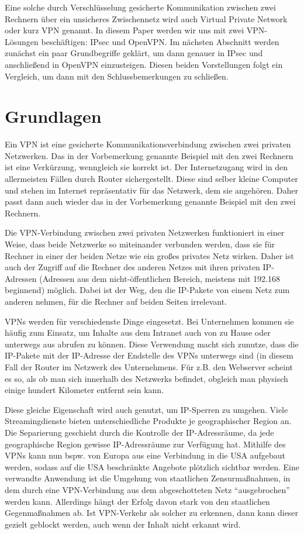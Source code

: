 \documentclass[12pt]{scrartcl}
\begin{document}
Eine solche durch Verschlüsselung gesicherte Kommunikation zwischen zwei Rechnern über ein unsicheres Zwischennetz wird auch Virtual Private Network oder kurz VPN genannt. In diesem Paper werden wir uns mit zwei VPN-Lösungen beschäftigen: IPsec und OpenVPN. Im nächsten Abschnitt werden zunächst ein paar Grundbegriffe geklärt, um dann genauer in IPsec und anschließend in OpenVPN einzusteigen. Diesen beiden Vorstellungen folgt ein Vergleich, um dann mit den Schlussbemerkungen zu schließen.

\section{Grundlagen}
Ein VPN ist eine gesicherte Kommunikationsverbindung zwischen zwei privaten Netzwerken. Das in der Vorbemerkung genannte Beispiel mit den zwei Rechnern ist eine Verkürzung, wenngleich sie korrekt ist. Der Internetzugang wird in den allermeisten Fällen durch Router sichergestellt. Diese sind selber kleine Computer und stehen im Internet repräsentativ für das Netzwerk, dem sie angehören. Daher passt dann auch wieder das in der Vorbemerkung genannte Beispiel mit den zwei Rechnern. 

Die VPN-Verbindung zwischen zwei privaten Netzwerken funktioniert in einer Weise, dass beide Netzwerke so miteinander verbunden werden, dass sie für Rechner in einer der beiden Netze wie ein großes privates Netz wirken. Daher ist auch der Zugriff auf die Rechner des anderen Netzes mit ihren privaten IP-Adressen (Adressen aus dem nicht-öffentlichen Bereich, meistens mit 192.168 beginnend) möglich. Dabei ist der Weg, den die IP-Pakete von einem Netz zum anderen nehmen, für die Rechner auf beiden Seiten irrelevant.

VPNs werden für verschiedenste Dinge eingesetzt. Bei Unternehmen kommen sie häufig zum Einsatz, um Inhalte aus dem Intranet auch von zu Hause oder unterwegs aus abrufen zu können. Diese Verwendung macht sich zunutze, dass die IP-Pakete mit der IP-Adresse der Endstelle des VPNs unterwegs sind (in diesem Fall der Router im Netzwerk des Unternehmens. Für z.B. den Webserver scheint es so, als ob man sich innerhalb des Netzwerks befindet, obgleich man physisch einige hundert Kilometer entfernt sein kann.

Diese gleiche Eigenschaft wird auch genutzt, um IP-Sperren zu umgehen. Viele Streamingdienste bieten unterschiedliche Produkte je geographischer Region an. Die Separierung geschieht durch die Kontrolle der IP-Adressräume, da jede geographische Region gewisse IP-Adressräume zur Verfügung hat. Mithilfe des VPNs kann nun bspw. von Europa aus eine Verbindung in die USA aufgebaut werden, sodass auf die USA beschränkte Angebote plötzlich sichtbar werden. Eine verwandte Anwendung ist die Umgehung von staatlichen Zensurmaßnahmen, in dem durch eine VPN-Verbindung aus dem abgeschotteten Netz "`ausgebrochen"' werden kann. Allerdings hängt der Erfolg davon stark von den staatlichen Gegenmaßnahmen ab. Ist VPN-Verkehr als solcher zu erkennen, dann kann dieser gezielt geblockt werden, auch wenn der Inhalt nicht erkannt wird.
\end{document}
